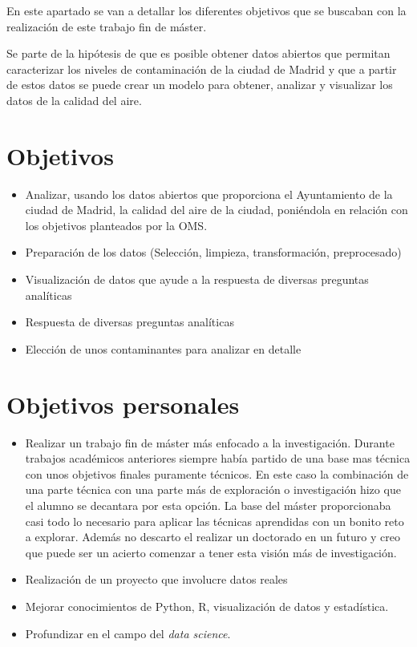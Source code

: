 
En este apartado se van a detallar los diferentes objetivos que se buscaban con la realización de este trabajo fin de máster.

Se parte de la hipótesis de que es posible obtener datos abiertos que permitan caracterizar  los niveles de contaminación de la ciudad de Madrid y que a partir de estos datos se puede crear un modelo para obtener, analizar y visualizar los datos 
de la calidad del aire.

\section{Objetivos}\label{objetivos-generales}

\begin{itemize}
\tightlist
\item Analizar, usando los datos abiertos que proporciona el Ayuntamiento de la ciudad de Madrid, la calidad del aire de la ciudad, poniéndola en relación con los objetivos planteados por la OMS.
\item Preparación de los datos (Selección, limpieza, transformación, preprocesado)
\item Visualización de datos que ayude a la respuesta de diversas preguntas analíticas 
\item Respuesta de diversas preguntas analíticas
\item Elección de unos contaminantes para analizar en detalle
\end{itemize}

\section{Objetivos personales}\label{objetivos-personales}
\begin{itemize}
\tightlist
\item
 Realizar un trabajo fin de máster más enfocado a la investigación. Durante trabajos académicos anteriores siempre había partido de una base mas técnica con unos objetivos finales puramente técnicos. En este caso la combinación de una parte técnica con una parte más de exploración o investigación hizo que el alumno se decantara por esta opción. La base del máster proporcionaba casi todo lo necesario para aplicar las técnicas aprendidas con un bonito reto a explorar. Además no descarto el realizar un doctorado en un futuro y creo que puede ser un acierto  comenzar a tener esta visión más de investigación.
 \item
 Realización de un proyecto que involucre datos reales
\item
  Mejorar conocimientos de Python, R, visualización de datos y estadística. 
  \item Profundizar en el campo del \textit{data science}.
\end{itemize}
